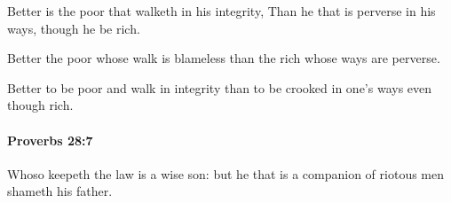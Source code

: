 			\begin{versebox}
					\item[BHS] 
					\item[ASV] Better is the poor that walketh in his integrity, Than he that is perverse in his ways, though he be rich.
					\item[NIV] Better the poor whose walk is blameless than the rich whose ways are perverse.
					\item[NRSV] Better to be poor and walk in integrity than to be crooked in one’s ways even though rich.
			\end{versebox}

		\paragraph{Proverbs 28:7} %
			\label{PROVERBS-28-7}

			Whoso keepeth the law is a wise son: but he that is a companion of riotous men shameth his father.

